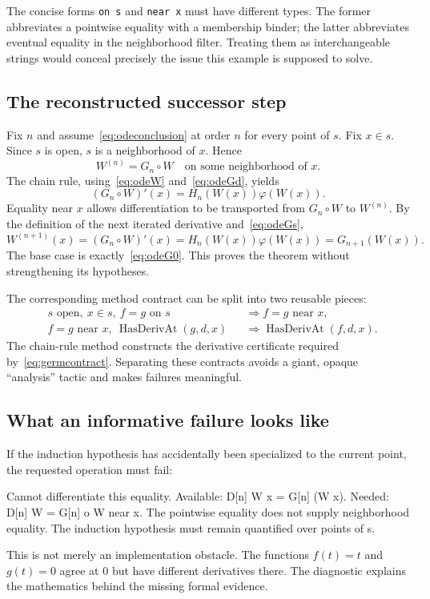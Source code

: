 \documentclass[11pt,a4paper]{article}
\theoremstyle{remark}
\newcommand{\ty}[1]{\texttt{#1}}
\begin{document}
The concise forms \ty{on s} and \ty{near x} must have different types. The former abbreviates a pointwise equality with a membership binder; the latter abbreviates eventual equality in the neighborhood filter. Treating them as interchangeable strings would conceal precisely the issue this example is supposed to solve.

\subsection{The reconstructed successor step}
Fix $n$ and assume~\eqref{eq:odeconclusion} at order $n$ for every point of $s$. Fix $x\in s$. Since $s$ is open, $s$ is a neighborhood of $x$. Hence
\[
W^{(n)}=G_n\circ W\quad\text{on some neighborhood of }x.
\]
The chain rule, using~\eqref{eq:odeW} and~\eqref{eq:odeGd}, yields
\[
(G_n\circ W)'(x)=H_n(W(x))\varphi(W(x)).
\]
Equality near $x$ allows differentiation to be transported from $G_n\circ W$ to $W^{(n)}$. By the definition of the next iterated derivative and~\eqref{eq:odeGs},
\[
W^{(n+1)}(x)
=(G_n\circ W)'(x)
=H_n(W(x))\varphi(W(x))
=G_{n+1}(W(x)).
\]
The base case is exactly~\eqref{eq:odeG0}. This proves the theorem without strengthening its hypotheses.

The corresponding method contract can be split into two reusable pieces:
\begin{align}
&s\text{ open},\ x\in s,\ f=g\text{ on }s
   &&\Longrightarrow f=g\text{ near }x,\label{eq:localitycontract}\\
&f=g\text{ near }x,\ \operatorname{HasDerivAt}(g,d,x)
   &&\Longrightarrow\operatorname{HasDerivAt}(f,d,x).\label{eq:germcontract}
\end{align}
The chain-rule method constructs the derivative certificate required by~\eqref{eq:germcontract}. Separating these contracts avoids a giant, opaque ``analysis'' tactic and makes failures meaningful.

\subsection{What an informative failure looks like}
If the induction hypothesis has accidentally been specialized to the current point, the requested operation must fail:
\Needspace{82pt}
\begin{code}
Cannot differentiate this equality.
Available: D[n] W x = G[n] (W x).
Needed:    D[n] W = G[n] o W near x.
The pointwise equality does not supply neighborhood equality.
The induction hypothesis must remain quantified over points of s.
\end{code}
This is not merely an implementation obstacle. The functions $f(t)=t$ and $g(t)=0$ agree at $0$ but have different derivatives there. The diagnostic explains the mathematics behind the missing formal evidence.
\end{document}
